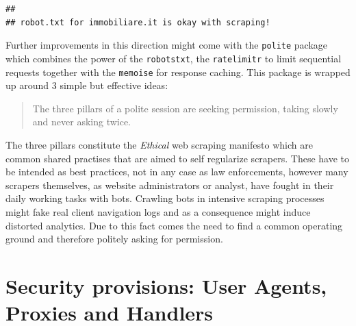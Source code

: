 \documentclass[
  12pt,
  a4paper,
  oneside]{book}
\theoremstyle{definition}
\theoremstyle{definition}
\theoremstyle{definition}
\theoremstyle{remark}
\begin{document}
\begin{verbatim}
## 
## robot.txt for immobiliare.it is okay with scraping!
\end{verbatim}

Further improvements in this direction might come with the \texttt{polite} package \citep{polite} which combines the power of the \texttt{robotstxt}, the \texttt{ratelimitr} \citep{ratelimitr} to limit sequential requests together with the \texttt{memoise} \citep{memoise} for response caching. This package is wrapped up around 3 simple but effective ideas:

\begin{quote}
The three pillars of a polite session are seeking permission, taking slowly and never asking twice.
\end{quote}

The three pillars constitute the \emph{Ethical} web scraping manifesto \citep{densmore_2019} which are common shared practises that are aimed to self regularize scrapers. These have to be intended as best practices, not in any case as law enforcements, however many scrapers themselves, as website administrators or analyst, have fought in their daily working tasks with bots. Crawling bots in intensive scraping processes might fake real client navigation logs and as a consequence might induce distorted analytics. Due to this fact comes the need to find a common operating ground and therefore politely asking for permission.

\hypertarget{security-provisions-user-agents-proxies-and-handlers}{%
\section{Security provisions: User Agents, Proxies and Handlers}\label{security-provisions-user-agents-proxies-and-handlers}}
\end{document}
